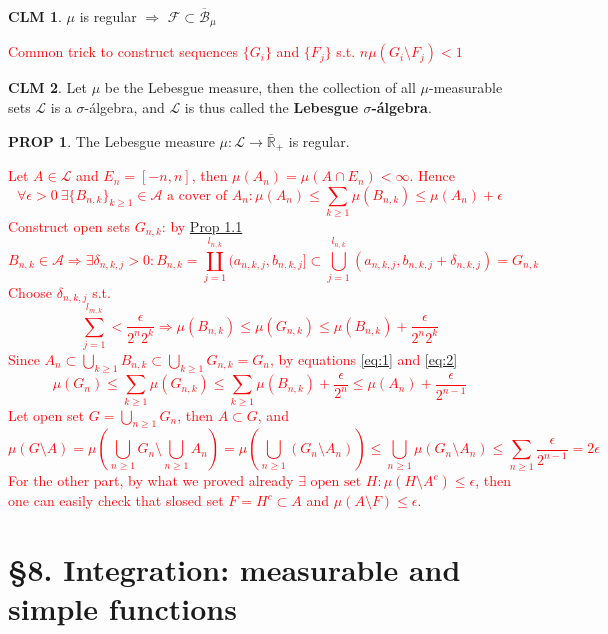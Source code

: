 \documentclass[hidelinks]{article}
\theoremstyle{definition}
\theoremstyle{dotless}
\newtheorem{proposition}{PROP}[section]
\newtheorem{claim}{CLM}[section]
\theoremstyle{remark}
\begin{document}
\begin{claim}
$\mu$ is regular $\Rightarrow$ $\mathscr{F}\subset\overline{\mathscr{B}}_\mu$
\end{claim}
\textcolor{red}{Common trick to construct sequences $\{G_i\}$ and $\{F_j\}$ s.t. $n\mu(G_i\setminus F_j)<1{}$}

\begin{claim}
Let $\mu$ be the Lebesgue measure, then the collection of all $\mu$-measurable sets $\mathscr{L}$ is a $\sigma$-álgebra, and $\mathscr{L}$ is thus called the \textbf{Lebesgue $\sigma$-álgebra}.
\end{claim}

\begin{proposition}
The Lebesgue measure $\mu:\mathscr{L}\to\overline{\mathbb{R}}_+$ is regular.
\end{proposition}
\textcolor{red}{Let $A\in\mathscr{L}$ and $E_n=[-n,n]$, then $\mu(A_n)=\mu(A\cap E_n)<\infty$. Hence \begin{equation}\label{eq:1}
\forall\epsilon>0\ \exists\{B_{n,k}\}_{k\geq1}\in\mathscr{A}\textrm{ a cover of }A_n:\mu(A_n)\leq\sum_{k\geq1}\mu(B_{n,k})\leq\mu(A_n)+\epsilon\end{equation}
Construct open sets $G_{n,k}$: by \hyperref[Prop 1.1]{Prop 1.1}
\[B_{n,k}\in\mathscr{A}\Rightarrow\exists\delta_{n,k,j}>0:B_{n,k}=\coprod_{j=1}^{l_{n,k}}(a_{n,k,j},b_{n,k,j}]\subset\bigcup_{j=1}^{l_{n,k}}(a_{n,k,j},b_{n,k,j}+\delta_{n,k,j})=G_{n,k}\]
Choose $\delta_{n,k,j}$ s.t. \begin{equation}\label{eq:2}
\sum_{j=1}^{l_{m,k}}<\frac{\epsilon}{2^n2^k}\Rightarrow\mu(B_{n,k})\leq\mu(G_{n,k})\leq\mu(B_{n,k})+\frac{\epsilon}{2^n2^k}\end{equation}
Since $A_n\subset\bigcup_{k\geq1}B_{n,k}\subset\bigcup_{k\geq1}G_{n,k}=G_n$, by equations \ref{eq:1} and \ref{eq:2}
\[\mu(G_n)\leq\sum_{k\geq1}\mu(G_{n,k})\leq\sum_{k\geq1}\mu(B_{n,k})+\frac{\epsilon}{2^n}\leq\mu(A_n)+\frac{\epsilon}{2^{n-1}}\]
Let open set $G=\bigcup_{n\geq1}G_n$, then $A\subset G$, and
\[\mu(G\setminus A)=\mu(\bigcup_{n\geq1}G_n\setminus \bigcup_{n\geq1}A_n)=\mu(\bigcup_{n\geq1}(G_n\setminus A_n))\leq\bigcup_{n\geq1}\mu(G_n\setminus A_n)\leq\sum_{n\geq1}\frac{\epsilon}{2^{n-1}}=2\epsilon\]
For the other part, by what we proved already $\exists\textrm{ open set }H:\mu(H\setminus A^c)\leq\epsilon$, then one can easily check that slosed set $F=H^c\subset A$ and $\mu(A\setminus F)\leq\epsilon$.}

\bigbreak

\section*{\S8. Integration: measurable and simple functions}
\setcounter{section}{8}
\end{document}
